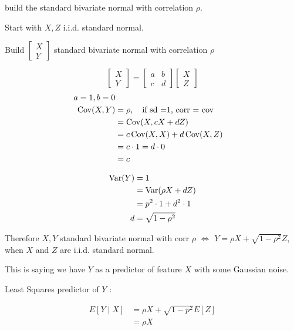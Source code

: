 \documentclass{report}
\begin{document}
build the standard bivariate normal with correlation $\rho$. 

Start with $X,Z$ i.i.d. standard normal. 


Build $\begin{bmatrix}
	X \\Y
\end{bmatrix}$ standard bivariate normal with correlation $\rho$ 

\[
\begin{bmatrix}
	X \\
	Y
\end{bmatrix} 
= \begin{bmatrix}
	a &b\\
	c &d
\end{bmatrix}\begin{bmatrix}
	X \\
	Z
\end{bmatrix}
\]
\begin{align*}
	a=1, b=0\\
	\operatorname{Cov}(X,Y) &= \rho ,\quad \text{if sd =1, corr = cov }\\
	&= \operatorname{Cov}(X, cX + dZ) \\
	&= c\operatorname{Cov}(X, X) + d\operatorname{Cov}(X,Z) \\
	&= c \cdot 1 =  d \cdot 0 \\
	&= c \\
\end{align*}

\begin{align*}
	\operatorname{Var}(Y) &= 1 \\
	&= \operatorname{Var}(\rho X + dZ) \\
	&= p^{2} \cdot 1  + d^{2} \cdot 1 \\ 
	d &= \sqrt{1- \rho^{2}} \\
\end{align*}


Therefore
$X,Y$  standard bivariate normal with corr $\rho$  $\iff$  $Y = \rho X + \sqrt{1-\rho^{2}} Z$, when $X $ and $Z$  are i.i.d. standard normal.


This is saying we have $Y$ as a predictor of feature $X$ with some Gaussian noise.


Least Squares predictor of $Y$ : 

\begin{align*}
	E[Y \mid X] &=  \rho X + \sqrt{1-p^{2}}E[Z] \\
	&= \rho X \\
\end{align*}
\end{document}
